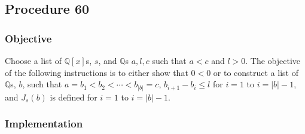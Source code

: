 \documentclass[twocolumn]{article}
\begin{document}
		\subsection{Procedure 60}\label{sec:procedure 60}
			\subsubsection{Objective}
				Choose a list of $\mathbb{Q}[x]$s, $s$, and $\mathbb{Q}$s $a,l,c$ such that $a<c$ and $l>0$. The objective of the following instructions is to either show that $0<0$ or to construct a list of $\mathbb{Q}$s, $b$, such that $a=b_1<b_2<\cdots<b_{\lvert b\rvert}=c$, $b_{i+1}-b_i\le l$ for $i=1$ to $i=\lvert b\rvert-1$, and $J_s(b)$ is defined for $i=1$ to $i=\lvert b\rvert-1$.
			\subsubsection{Implementation}
\end{document}
